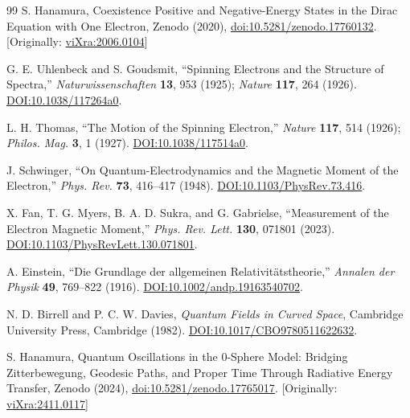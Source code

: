 \documentclass[%
 reprint,
 amsmath,amssymb,
 aps,
]{revtex4-1}
\numberwithin{equation}{section}%
\begin{document}
\begin{thebibliography}{99}
S. Hanamura, Coexistence Positive and Negative-Energy States in the Dirac Equation with One Electron, Zenodo (2020), \href{https://doi.org/10.5281/zenodo.17760132}{doi:10.5281/zenodo.17760132}. [Originally: \href{https://vixra.org/abs/2006.0104}{viXra:2006.0104}]

G. E. Uhlenbeck and S. Goudsmit,
``Spinning Electrons and the Structure of Spectra,''
\textit{Naturwissenschaften} \textbf{13}, 953 (1925);
\textit{Nature} \textbf{117}, 264 (1926).
\href{https://doi.org/10.1038/117264a0}{DOI:10.1038/117264a0}.

L. H. Thomas,
``The Motion of the Spinning Electron,''
\textit{Nature} \textbf{117}, 514 (1926);
\textit{Philos. Mag.} \textbf{3}, 1 (1927).
\href{https://doi.org/10.1038/117514a0}{DOI:10.1038/117514a0}.

J. Schwinger,
``On Quantum-Electrodynamics and the Magnetic Moment of the Electron,''
\textit{Phys. Rev.} \textbf{73}, 416--417 (1948).
\href{https://doi.org/10.1103/PhysRev.73.416}{DOI:10.1103/PhysRev.73.416}.

X. Fan, T. G. Myers, B. A. D. Sukra, and G. Gabrielse,
``Measurement of the Electron Magnetic Moment,''
\textit{Phys. Rev. Lett.} \textbf{130}, 071801 (2023).
\href{https://doi.org/10.1103/PhysRevLett.130.071801}{DOI:10.1103/PhysRevLett.130.071801}.

A. Einstein,
``Die Grundlage der allgemeinen Relativitätstheorie,''
\textit{Annalen der Physik} \textbf{49}, 769--822 (1916).
\href{https://doi.org/10.1002/andp.19163540702}{DOI:10.1002/andp.19163540702}.

N. D. Birrell and P. C. W. Davies,
\textit{Quantum Fields in Curved Space},
Cambridge University Press, Cambridge (1982).
\href{https://doi.org/10.1017/CBO9780511622632}{DOI:10.1017/CBO9780511622632}.

S. Hanamura, Quantum Oscillations in the 0-Sphere Model: Bridging Zitterbewegung, Geodesic Paths, and Proper Time Through Radiative Energy Transfer, Zenodo (2024), \href{https://doi.org/10.5281/zenodo.17765017}{doi:10.5281/zenodo.17765017}. [Originally: \href{https://vixra.org/abs/2411.0117}{viXra:2411.0117}]


\end{thebibliography}
\end{document}
